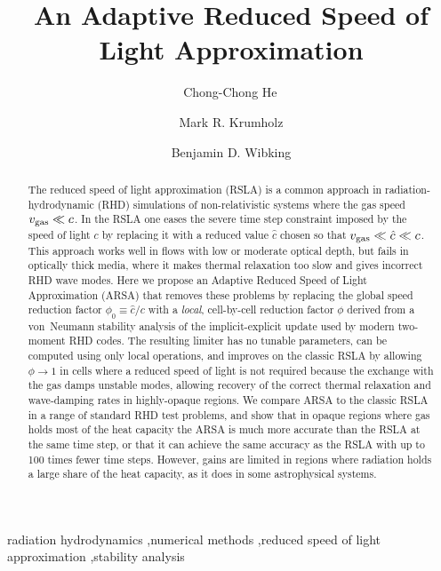 \documentclass[preprint,12pt,authoryear]{elsarticle}
\begin{document}
\begin{frontmatter}

\title{An Adaptive Reduced Speed of Light Approximation}

\author[inst1]{Chong-Chong He\,}


\author[inst1]{Mark R. Krumholz }

\author[inst2]{Benjamin D. Wibking }


\begin{abstract}
The reduced speed of light approximation (RSLA) is a common approach in radiation-hydrodynamic (RHD) simulations of non-relativistic systems where the gas speed $v_{\rm gas} \ll c$. In the RSLA one eases the severe time step constraint imposed by the speed of light $c$ by replacing it with a reduced value $\hat{c}$ chosen so that $v_{\rm gas} \ll \hat{c} \ll c$. This  approach works well in flows with low or moderate optical depth, but fails in optically thick media, where it makes thermal relaxation too slow and gives incorrect RHD wave modes. Here we propose an Adaptive Reduced Speed of Light Approximation (ARSA) that removes these problems by replacing the global speed reduction factor $\phi_0 \equiv \hat{c}/c$ with a \textit{local}, cell-by-cell reduction factor $\phi$ derived from a von~Neumann stability analysis of the implicit-explicit update used by modern two-moment RHD codes. The resulting limiter has no tunable parameters, can be computed using only local operations, and improves on the classic RSLA by allowing $\phi \to 1$ in cells where a reduced speed of light is not required because the exchange with the gas damps unstable modes, allowing recovery of the correct thermal relaxation and wave-damping rates in highly-opaque regions. We compare ARSA to the classic RSLA in a range of standard RHD test problems, and show that in opaque regions where gas holds most of the heat capacity the ARSA is much more accurate than the RSLA at the same time step, or that it can achieve the same accuracy as the RSLA with up to 100 times fewer time steps. However, gains are limited in regions where radiation holds a large share of the heat capacity, as it does in some astrophysical systems.
\end{abstract}

\begin{keyword}
radiation hydrodynamics \sep numerical methods \sep reduced speed of light approximation \sep stability analysis
\end{keyword}

\end{frontmatter}
\end{document}
